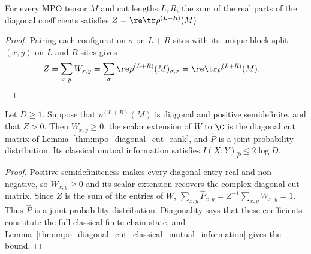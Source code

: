 \begin{lemma}
    \label{lem:mpo_diagonal_cut_mass_trace}
    \leanok
    For every MPO tensor $M$ and cut lengths $L,R$, the sum of the real parts
    of the diagonal coefficients satisfies $Z=\re\tr\rho^{(L+R)}(M)$.
\end{lemma}
\begin{proof}\leanok
    Pairing each configuration $\sigma$ on $L+R$ sites with its unique block
    split $(x,y)$ on $L$ and $R$ sites gives
    \begin{align}
        Z
         & =\sum_{x,y}W_{x,y}
        =\sum_\sigma\re\rho^{(L+R)}(M)_{\sigma,\sigma}
        =\re\tr\rho^{(L+R)}(M).
        \notag
    \end{align}
\end{proof}

\begin{lemma}
    \label{thm:mpo_diagonal_finite_chain_classical_mutual_information}
    \leanok
    Let $D\geq1$. Suppose that $\rho^{(L+R)}(M)$ is diagonal and positive
    semidefinite, and that $Z>0$. Then $W_{x,y}\geq0$, the scalar extension of
    $W$ to $\C$ is the diagonal cut matrix of
    Lemma~\ref{thm:mpo_diagonal_cut_rank}, and $\widehat P$ is a joint
    probability distribution. Its classical mutual information satisfies
    $I(X:Y)_{\widehat P}\leq2\log D$.
\end{lemma}
\begin{proof}\leanok
    Positive semidefiniteness makes every diagonal entry real and non-negative,
    so $W_{x,y}\geq0$ and its scalar extension recovers the complex diagonal
    cut matrix. Since $Z$ is the sum of the entries of $W$,
    $\sum_{x,y}\widehat P_{x,y}
        =Z^{-1}\sum_{x,y}W_{x,y}=1$.
    Thus $\widehat P$ is a joint probability distribution. Diagonality says
    that these coefficients constitute the full classical finite-chain state,
    and Lemma~\ref{thm:mpo_diagonal_cut_classical_mutual_information} gives
    the bound.
\end{proof}

